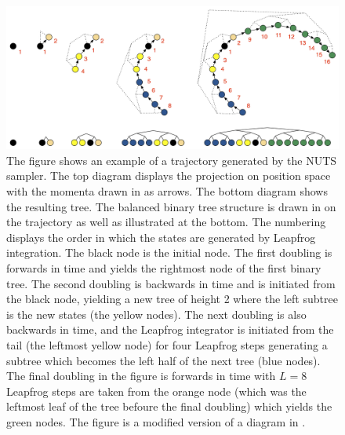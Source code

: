 \begin{figure}[h!]
    \centering
    \includegraphics[scale=0.075]{figures/drawings/doubling3_with_numbering.png}
    \caption{The figure shows an example of a trajectory generated by the NUTS sampler. The top diagram displays the projection on position space with the momenta drawn in as arrows. The bottom diagram shows the resulting tree. The balanced binary tree structure is drawn in on the trajectory as well as illustrated at the bottom. The numbering displays the order in which the states are generated by Leapfrog integration. The black node is the initial node. The first doubling is forwards in time and yields the rightmost node of the first binary tree. The second doubling is backwards in time and is initiated from the black node, yielding a new tree of height 2 where the left subtree is the new states (the yellow nodes). The next doubling is also backwards in time, and the Leapfrog integrator is initiated from the tail (the leftmost yellow node) for four Leapfrog steps generating a subtree which becomes the left half of the next tree (blue nodes). The final doubling in the figure is forwards in time with $L = 8$ Leapfrog steps are taken from the orange node (which was the leftmost leaf of the tree befoure the final doubling) which yields the green nodes. The figure is a modified version of a diagram in \cite{nuts}.}\label{fig:nuts_trajectory}
\end{figure}

